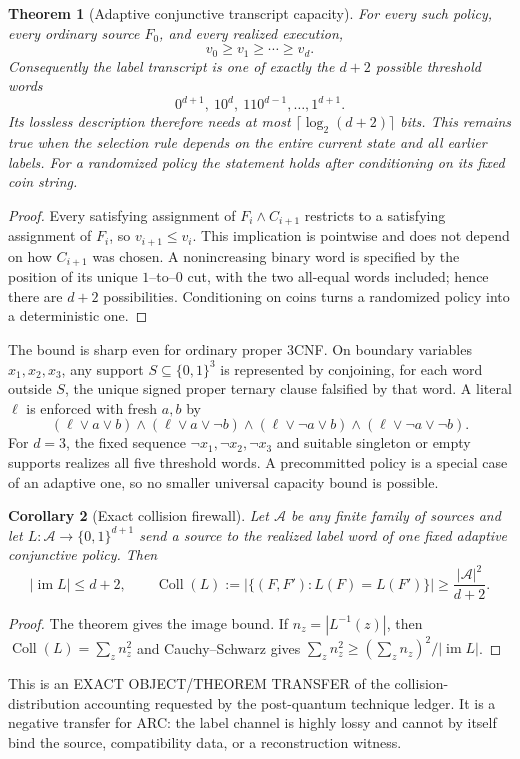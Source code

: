 \documentclass[11pt]{article}
\newtheorem{theorem}{Theorem}
\newtheorem{corollary}[theorem]{Corollary}
\begin{document}
\begin{theorem}[Adaptive conjunctive transcript capacity]
For every such policy, every ordinary source $F_0$, and every realized
execution,
\[
 v_0\ge v_1\ge\cdots\ge v_d.
\]
Consequently the label transcript is one of exactly the $d+2$ possible
threshold words
\[
 0^{d+1},\ 10^d,\ 110^{d-1},\ldots,1^{d+1}.
\]
Its lossless description therefore needs at most
$\lceil\log_2(d+2)\rceil$ bits.  This remains true when the selection rule
depends on the entire current state and all earlier labels.  For a randomized
policy the statement holds after conditioning on its fixed coin string.
\end{theorem}
\begin{proof}
Every satisfying assignment of $F_i\wedge C_{i+1}$ restricts to a satisfying
assignment of $F_i$, so $v_{i+1}\le v_i$.  This implication is pointwise and
does not depend on how $C_{i+1}$ was chosen.  A nonincreasing binary word is
specified by the position of its unique $1$--to--$0$ cut, with the two
all-equal words included; hence there are $d+2$ possibilities.  Conditioning
on coins turns a randomized policy into a deterministic one.
\end{proof}

The bound is sharp even for ordinary proper 3CNF.  On boundary variables
$x_1,x_2,x_3$, any support $S\subseteq\{0,1\}^3$ is represented by
conjoining, for each word outside $S$, the unique signed proper ternary clause
falsified by that word.  A literal $\ell$ is enforced with fresh $a,b$ by
\[
 (\ell\vee a\vee b)\wedge(\ell\vee a\vee\neg b)\wedge
 (\ell\vee\neg a\vee b)\wedge
 (\ell\vee\neg a\vee\neg b).
\]
For $d=3$, the fixed sequence
$\neg x_1,\neg x_2,\neg x_3$ and suitable singleton or empty supports
realizes all five threshold words.  A precommitted policy is a special case
of an adaptive one, so no smaller universal capacity bound is possible.

\begin{corollary}[Exact collision firewall]
Let $\mathcal A$ be any finite family of sources and let
$L:\mathcal A\to\{0,1\}^{d+1}$ send a source to the realized label word of
one fixed adaptive conjunctive policy.  Then
\[
 |\operatorname{im}L|\le d+2,\qquad
 \operatorname{Coll}(L):=
 \bigl|\{(F,F'):L(F)=L(F')\}\bigr|
 \ge \frac{|\mathcal A|^2}{d+2}.
\]
\end{corollary}
\begin{proof}
The theorem gives the image bound.  If $n_z=|L^{-1}(z)|$, then
$\operatorname{Coll}(L)=\sum_z n_z^2$ and Cauchy--Schwarz gives
$\sum_z n_z^2\ge(\sum_z n_z)^2/|\operatorname{im}L|$.
\end{proof}
This is an EXACT OBJECT/THEOREM TRANSFER of the collision-distribution
accounting requested by the post-quantum technique ledger.  It is a negative
transfer for ARC: the label channel is highly lossy and cannot by itself bind
the source, compatibility data, or a reconstruction witness.
\end{document}
